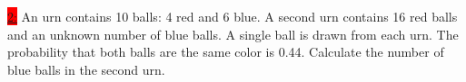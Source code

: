 \documentclass{exam}
\begin{document}
\begin{parts}
\begin{solution}
    \end{solution}
\end{parts}


\colorbox{red}{\underline{2:}} An urn contains 10 balls: 4 red and 6 blue. A second urn contains 16 red balls and an unknown number of blue balls. A single ball is drawn from each urn. The probability that both balls are the same color is 0.44. Calculate the number of blue balls in the second urn.
\end{document}
